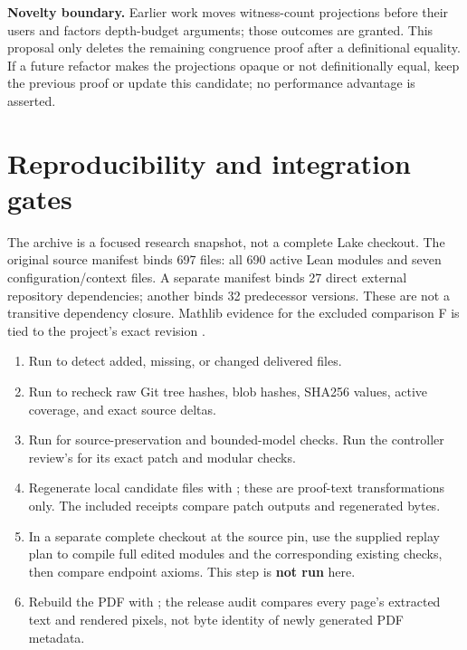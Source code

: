\textbf{Novelty boundary.} Earlier work moves witness-count projections before their users and factors depth-budget arguments; those outcomes are granted. This proposal only deletes the remaining congruence proof after a definitional equality. If a future refactor makes the projections opaque or not definitionally equal, keep the previous proof or update this candidate; no performance advantage is asserted.

\newpage
\section{Reproducibility and integration gates}
The archive is a focused research snapshot, not a complete Lake checkout. The original source manifest binds 697 files: all 690 active Lean modules and seven configuration/context files. A separate manifest binds 27 direct external repository dependencies; another binds 32 predecessor versions. These are not a transitive dependency closure. Mathlib evidence for the excluded comparison F is tied to the project's exact revision .

\begin{enumerate}
\item Run  to detect added, missing, or changed delivered files.
\item Run  to recheck raw Git tree hashes, blob hashes, SHA256 values, active coverage, and exact source deltas.
\item Run  for source-preservation and bounded-model checks. Run the controller review's  for its exact patch and modular checks.
\item Regenerate local candidate files with ; these are proof-text transformations only. The included receipts compare patch outputs and regenerated bytes.
\item In a separate complete checkout at the source pin, use the supplied replay plan to compile full edited modules and the corresponding existing checks, then compare endpoint axioms. This step is \textbf{not run} here.
\item Rebuild the PDF with ; the release audit compares every page's extracted text and rendered pixels, not byte identity of newly generated PDF metadata.
\end{enumerate}

